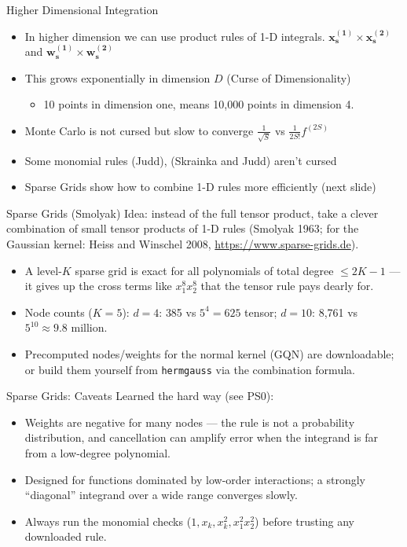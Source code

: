 \documentclass[aspectratio=169,11pt]{beamer}
\begin{document}
\begin{frame}{Higher Dimensional Integration}
\begin{itemize}
\item In higher dimension we can use product rules of 1-D integrals. $\symbf{x_s^{(1)}} \times \symbf{x_s^{(2)}}$ and $\symbf{w_s^{(1)}} \times \symbf{w_s^{(2)}}$
\item This grows exponentially in dimension $D$ (Curse of Dimensionality)
\begin{itemize}
\item 10 points in dimension one, means 10{,}000 points in dimension 4.
\end{itemize}

\item Monte Carlo is not cursed but slow to converge $\frac{1}{\sqrt{S}}$ vs $\frac{1}{2S!} f^{(2S)}$
\item Some monomial rules (Judd), (Skrainka and Judd) aren't cursed
\item Sparse Grids show how to combine 1-D rules more efficiently (next slide)
\end{itemize}
\end{frame}

\begin{frame}{Sparse Grids (Smolyak)}
Idea: instead of the full tensor product, take a clever \alert{combination of small tensor products} of 1-D rules (Smolyak 1963; for the Gaussian kernel: Heiss and Winschel 2008, \url{https://www.sparse-grids.de}).
\begin{itemize}
\item A level-$K$ sparse grid is exact for all polynomials of \alert{total degree} $\leq 2K-1$ --- it gives up the cross terms like $x_1^{8} x_2^{8}$ that the tensor rule pays dearly for.
\item Node counts ($K=5$): $d=4$: \alert{385} vs $5^4 = 625$ tensor; $d = 10$: \alert{8{,}761} vs $5^{10} \approx 9.8$ million.
\item Precomputed nodes/weights for the normal kernel (GQN) are downloadable; or build them yourself from \texttt{hermgauss} via the combination formula.
\end{itemize}
\end{frame}

\begin{frame}{Sparse Grids: Caveats}
Learned the hard way (see PS0):
\begin{itemize}
\item Weights are \alert{negative} for many nodes --- the rule is not a probability distribution, and cancellation can amplify error when the integrand is far from a low-degree polynomial.
\item Designed for functions dominated by \alert{low-order interactions}; a strongly ``diagonal'' integrand over a wide range converges slowly.
\item Always run the monomial checks ($1, x_k, x_k^2, x_1^2x_2^2$) before trusting any downloaded rule.
\end{itemize}
\end{frame}
\end{document}
